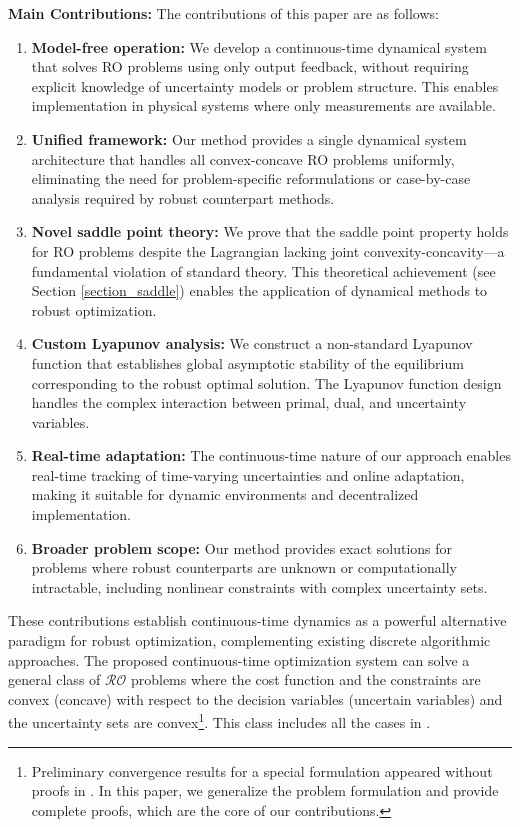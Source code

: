 \documentclass[journal,twoside,web]{ieeecolor}
\newcommand{\rev}[1]{\textcolor{revisionblue}{#1}}
\begin{document}
\rev{\textbf{Main Contributions:} The contributions of this paper are as follows:}
\begin{enumerate}
\item \rev{\textbf{Model-free operation:} We develop a continuous-time dynamical system that solves RO problems using only output feedback, without requiring explicit knowledge of uncertainty models or problem structure. This enables implementation in physical systems where only measurements are available.}

\item \rev{\textbf{Unified framework:} Our method provides a single dynamical system architecture that handles all convex-concave RO problems uniformly, eliminating the need for problem-specific reformulations or case-by-case analysis required by robust counterpart methods.}

\item \rev{\textbf{Novel saddle point theory:} We prove that the saddle point property holds for RO problems despite the Lagrangian lacking joint convexity-concavity—a fundamental violation of standard theory. This theoretical achievement (see Section \ref{section_saddle}) enables the application of dynamical methods to robust optimization.}

\item \rev{\textbf{Custom Lyapunov analysis:} We construct a non-standard Lyapunov function that establishes global asymptotic stability of the equilibrium corresponding to the robust optimal solution. The Lyapunov function design handles the complex interaction between primal, dual, and uncertainty variables.}

\item \rev{\textbf{Real-time adaptation:} The continuous-time nature of our approach enables real-time tracking of time-varying uncertainties and online adaptation, making it suitable for dynamic environments and decentralized implementation.}

\item \rev{\textbf{Broader problem scope:} Our method provides exact solutions for problems where robust counterparts are unknown or computationally intractable, including nonlinear constraints with complex uncertainty sets.}
\end{enumerate}

{\color{revisionblue}These contributions establish continuous-time dynamics as a powerful alternative paradigm for robust optimization, complementing existing discrete algorithmic approaches.} The proposed continuous-time optimization system can solve a general class of $\mathcal{RO}$ problems where the cost function and the constraints are convex (concave) with respect to the decision variables (uncertain variables) and the uncertainty sets are convex\footnote{Preliminary convergence results for a special formulation appeared without proofs in \cite{ebrahimi2019continuous}. In this paper, we generalize the problem formulation and provide complete proofs, which are the core of our contributions.}. This class includes all the cases in \cite[~Table 1]{gorissen20152}.
\end{document}
